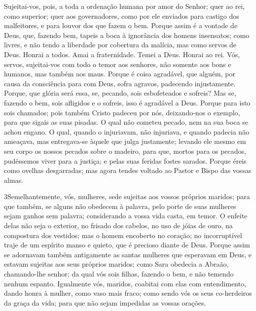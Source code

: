 Sujeitai-vos, pois, a toda a ordenação humana por amor do Senhor;
quer ao rei, como superior; quer aos governadores, como por
ele enviados para castigo dos malfeitores, e para louvor dos que
fazem o bem. Porque assim é a vontade de Deus, que, fazendo
bem, tapeis a boca à ignorância dos homens insensatos; como
livres, e não tendo a liberdade por cobertura da malícia, mas como
servos de Deus. Honrai a todos. Amai a fraternidade. Temei a
Deus. Honrai ao rei. Vós, servos, sujeitai-vos com todo o
temor aos senhores, não somente aos bons e humanos, mas também aos
maus. Porque é coisa agradável, que alguém, por causa da
consciência para com Deus, sofra agravos, padecendo injustamente.
Porque, que glória será essa, se, pecando, sois esbofeteados
e sofreis? Mas se, fazendo o bem, sois afligidos e o sofreis, isso é
agradável a Deus. Porque para isto sois chamados; pois também
Cristo padeceu por nós, deixando-nos o exemplo, para que sigais as
suas pisadas. O qual não cometeu pecado, nem na sua boca se
achou engano. O qual, quando o injuriavam, não injuriava, e
quando padecia não ameaçava, mas entregava-se àquele que julga
justamente; levando ele mesmo em seu corpo os nossos pecados
sobre o madeiro, para que, mortos para os pecados, pudéssemos viver
para a justiça; e pelas suas feridas fostes sarados. Porque
éreis como ovelhas desgarradas; mas agora tendes voltado ao Pastor e
Bispo das vossas almas.

\medskip

\lettrine{3} Semelhantemente, vós, mulheres, sede sujeitas aos
vossos próprios maridos; para que também, se alguns não obedecem à
palavra, pelo porte de suas mulheres sejam ganhos sem palavra;
considerando a vossa vida casta, em temor. O enfeite delas
não seja o exterior, no frisado dos cabelos, no uso de jóias de
ouro, na compostura dos vestidos; mas o homem encoberto no
coração; no incorruptível traje de um espírito manso e quieto, que é
precioso diante de Deus. Porque assim se adornavam também
antigamente as santas mulheres que esperavam em Deus, e estavam
sujeitas aos seus próprios maridos; como Sara obedecia a Abraão,
chamando-lhe senhor; da qual vós sois filhas, fazendo o bem, e não
temendo nenhum espanto. Igualmente vós, maridos, coabitai com
elas com entendimento, dando honra à mulher, como vaso mais fraco;
como sendo vós os seus co-herdeiros da graça da vida; para que não
sejam impedidas as vossas orações.

